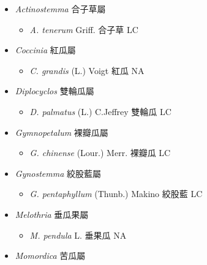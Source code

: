 
  \begin{itemize}
 \item[] \textit{Actinostemma} 合子草屬
                                
  \begin{itemize}
        \item[] \textit{A. tenerum} Griff.  合子草   LC
  \end{itemize}
 \item[] \textit{Coccinia} 紅瓜屬
                                
  \begin{itemize}
        \item[] \textit{C. grandis} (L.) Voigt  紅瓜   NA
  \end{itemize}
 \item[] \textit{Diplocyclos} 雙輪瓜屬
                                
  \begin{itemize}
        \item[] \textit{D. palmatus} (L.) C.Jeffrey  雙輪瓜   LC
  \end{itemize}
 \item[] \textit{Gymnopetalum} 裸瓣瓜屬
                                
  \begin{itemize}
        \item[] \textit{G. chinense} (Lour.) Merr.  裸瓣瓜   LC
  \end{itemize}
 \item[] \textit{Gynostemma} 絞股藍屬
                                
  \begin{itemize}
        \item[] \textit{G. pentaphyllum} (Thunb.) Makino  絞股藍   LC
  \end{itemize}
 \item[] \textit{Melothria} 垂瓜果屬
                                
  \begin{itemize}
        \item[] \textit{M. pendula} L.  垂果瓜   NA
  \end{itemize}
 \item[] \textit{Momordica} 苦瓜屬
                                

\end{itemize}
